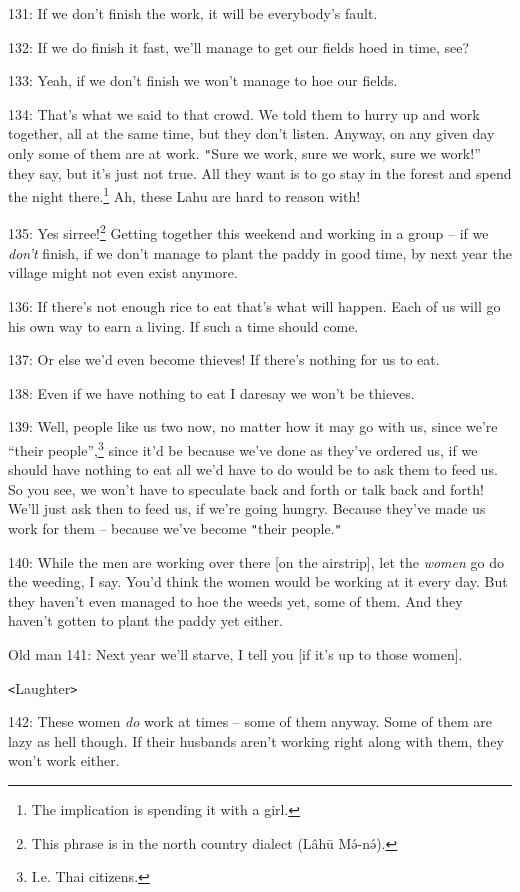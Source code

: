 131: If we don't finish the work, it will be everybody's fault.

132: If we do finish it fast, we'll manage to get our fields hoed in time, see?

133: Yeah, if we don't finish we won't manage to hoe our fields.

134: That's what we said to that crowd. We told them to hurry up and work together,
all at the same time, but they don't listen. Anyway, on any given day only some
of them are at work. \texttt{"}Sure we work, sure we work, sure we work!'' they
say, but it's just not true. All they want is to go stay in the forest and spend
the night there.\footnote{The implication is spending it with a girl.} Ah, these Lahu are hard to reason with!

135: Yes sirree!\footnote{This phrase is in the north country dialect (Lâhū Mə́-nə́).} Getting together this weekend and working in a group -- if
we\textit{ don't} finish, if we don't manage to plant the paddy in good time, by
next year the village might not even exist anymore.

136: If there's not enough rice to eat that's what will happen. Each of us will
go his own way to earn a living. If such a time should come.

137: Or else we'd even become thieves! If there's nothing for us to eat.

138: Even if we have nothing to eat I daresay we won't be thieves.

139: Well, people like us two now, no matter how it may go with us, since we're
``their people'',\footnote{I.e. Thai citizens.} since it'd be because we've done as they've ordered us, if
we should have nothing to eat all we'd have to do would be to ask them to feed
us. So you see, we won't have to speculate back and forth or talk back and forth!
We'll just ask then to feed us, if we're going hungry. Because they've made us
work for them -- because we've become \texttt{"}their people.\texttt{"}

140: While the men are working over there [on the airstrip], let the \textit{women
}go do the weeding, I say. You'd think the women would be working at it every day.
But they haven't even managed to hoe the weeds yet, some of them. And they haven't
gotten to plant the paddy yet either.

Old man 141: Next year we'll starve, I tell you [if it's up to those women].

\texttt{<}Laughter\texttt{>}

142: These women \textit{do} work at times -- some of them anyway. Some of them
are lazy as hell though. If their husbands aren't working right along with them,
they won't work either.

